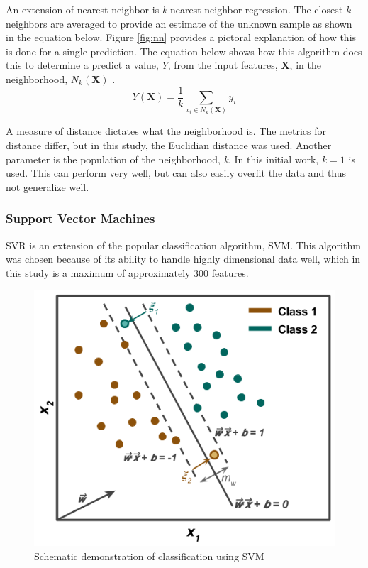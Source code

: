 An extension of nearest neighbor is \textit{k}-nearest neighbor regression.
The closest \textit{k} neighbors are averaged to provide an estimate of the
unknown sample as shown in the equation below.  Figure \ref{fig:nn} provides a
pictoral explanation of how this is done for a single prediction.  The equation
below shows how this algorithm does this to determine a predict a value, $Y$,
from the input features, $\boldsymbol{X}$, in the neighborhood, $N_k
(\boldsymbol{X})$ \cite{elements_stats}. 
\begin{equation}
  Y(\boldsymbol{X}) = \frac{1}{k} \sum_{x_i \in N_k(\boldsymbol{X})} y_i
\end{equation}

A measure of distance dictates what the neighborhood is. The metrics for
distance differ, but in this study, the Euclidian distance was used. Another
parameter is the population of the neighborhood, \textit{k}. In this initial
work, $k = 1$ is used. This can perform very well, but can also easily overfit
the data and thus not generalize well. 

\subsubsection{Support Vector Machines}
\label{sec:svm}

\Acrfull{SVR} is an extension of the popular classification algorithm, \acrfull{SVM}.
This algorithm was chosen because of its ability to handle highly dimensional
data well, which in this study is a maximum of approximately 300 features. 

\begin{figure}[!htb]
  \centering
  \includegraphics[width=0.8\linewidth]{./chapters/litrev/svm.png}
  \caption{Schematic demonstration of classification using SVM}
  \label{fig:svm}
\end{figure}

